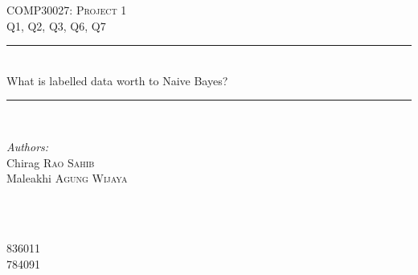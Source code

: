 \documentclass[a4paper]{article}
\begin{document}
\begin{titlepage}

\newcommand{\HRule}{\rule{\linewidth}{0.5mm}} %

\center %


\textsc{\LARGE COMP30027: Project 1}\\[1.5cm] %
\textsc{\large Q1, Q2, Q3, Q6, Q7}\\[0.5cm] %


\HRule \\[0.4cm]
{ \huge What is labelled data worth to Naive Bayes?}\\[0.3cm] %
\HRule \\[1.5cm]


\begin{minipage}{0.4\textwidth}
\begin{flushleft} \large
\emph{Authors:}\\
Chirag \textsc{Rao Sahib}\\
Maleakhi \textsc{Agung Wijaya}
\end{flushleft}
\end{minipage}
~
\begin{minipage}{0.4\textwidth}
\begin{flushright} \large
\emph{} \\
836011\\
784091
\end{flushright}
\end{minipage}\\[2cm]



\end{titlepage}
\end{document}
